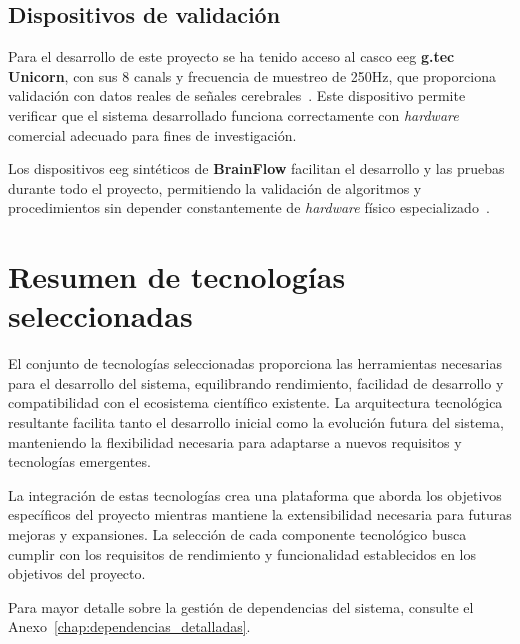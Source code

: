 \subsection{Dispositivos de validación}
\label{subsec:dispositivos_validacion}

Para el desarrollo de este proyecto se ha tenido acceso al casco \acrshort{eeg} \textbf{g.tec Unicorn}, con sus 8 \glspl{canal} y frecuencia de muestreo de 250Hz, que proporciona validación con datos reales de señales cerebrales~\cite{gtec_unicorn}. Este dispositivo permite verificar que el sistema desarrollado funciona correctamente con \textit{hardware} comercial adecuado para fines de investigación.

Los dispositivos \acrshort{eeg} sintéticos de \textbf{BrainFlow} facilitan el desarrollo y las pruebas durante todo el proyecto, permitiendo la validación de algoritmos y procedimientos sin depender constantemente de \textit{hardware} físico especializado~\cite{brainflow}.

\section{Resumen de tecnologías seleccionadas}
\label{sec:resumen_tecnologias}

El conjunto de tecnologías seleccionadas proporciona las herramientas necesarias para el desarrollo del sistema, equilibrando rendimiento, facilidad de desarrollo y compatibilidad con el ecosistema científico existente. La arquitectura tecnológica resultante facilita tanto el desarrollo inicial como la evolución futura del sistema, manteniendo la flexibilidad necesaria para adaptarse a nuevos requisitos y tecnologías emergentes.

La integración de estas tecnologías crea una plataforma que aborda los objetivos específicos del proyecto mientras mantiene la extensibilidad necesaria para futuras mejoras y expansiones. La selección de cada componente tecnológico busca cumplir con los requisitos de rendimiento y funcionalidad establecidos en los objetivos del proyecto.

Para mayor detalle sobre la gestión de dependencias del sistema, consulte el Anexo~\ref{chap:dependencias_detalladas}.
